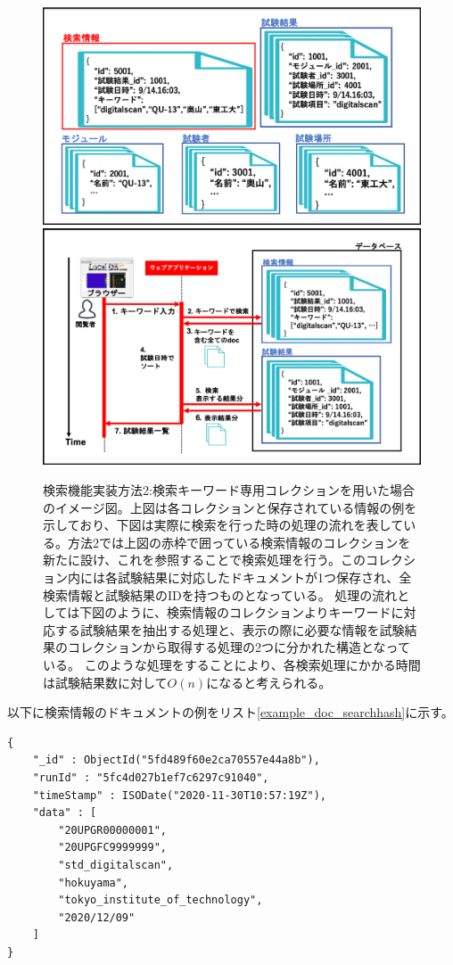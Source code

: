 \begin{figure}[bpt]
  \begin{center}
    \includegraphics[width=12cm]{search_mongo_collection}
    \includegraphics[width=12cm]{search_mongo_collection_flow}
  \caption[検索機能実装方法2:検索キーワード専用コレクションを用いた場合]{検索機能実装方法2:検索キーワード専用コレクションを用いた場合のイメージ図。上図は各コレクションと保存されている情報の例を示しており、下図は実際に検索を行った時の処理の流れを表している。方法2では上図の赤枠で囲っている検索情報のコレクションを新たに設け、これを参照することで検索処理を行う。このコレクション内には各試験結果に対応したドキュメントが1つ保存され、全検索情報と試験結果のIDを持つものとなっている。
処理の流れとしては下図のように、検索情報のコレクションよりキーワードに対応する試験結果を抽出する処理と、表示の際に必要な情報を試験結果のコレクションから取得する処理の2つに分かれた構造となっている。
このような処理をすることにより、各検索処理にかかる時間は試験結果数に対して$O(n)$になると考えられる。}
  \label{search_mongo_collection}
  \end{center}
\end{figure}

以下に検索情報のドキュメントの例をリスト\ref{example_doc_searchhash}に示す。
\begin{lstlisting}[basicstyle=\scriptsize,caption=検索情報コレクションに入るドキュメントの例。このように試験結果のID、試験日時、検索対象となる名前情報が保存される。,label=example_doc_searchhash]
{
	"_id" : ObjectId("5fd489f60e2ca70557e44a8b"),
	"runId" : "5fc4d027b1ef7c6297c91040",
	"timeStamp" : ISODate("2020-11-30T10:57:19Z"),
	"data" : [
		"20UPGR00000001",
		"20UPGFC9999999",
		"std_digitalscan",
		"hokuyama",
		"tokyo_institute_of_technology",
		"2020/12/09"
	]
}
\end{lstlisting}

